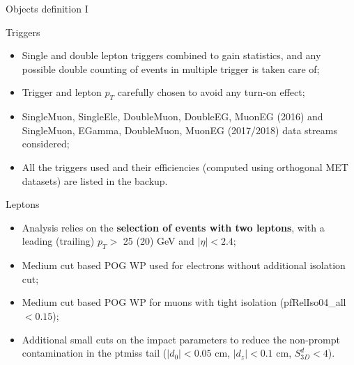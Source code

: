 \documentclass[8pt]{beamer}
\begin{document}
\begin{frame}{Objects definition I}
\justifying

\vspace{5pt} \begin{block}{\centering Triggers}\end{block} \vspace{-6pt}
\begin{itemize}
\justifying
\item \alert{Single and double lepton triggers} combined to gain statistics, and any possible double counting of events in multiple trigger is taken care of;
\item Trigger and lepton $p_T$ carefully chosen to avoid any turn-on effect;
\item SingleMuon, SingleEle, DoubleMuon, DoubleEG, MuonEG (2016) and SingleMuon, EGamma, DoubleMuon, MuonEG (2017/2018) data streams considered;
\item All the triggers used and their efficiencies (computed using orthogonal MET datasets) are listed in the backup.
\end{itemize} \vfill

\begin{block}{\centering Leptons}\end{block} \vspace{-6pt}
\begin{itemize}
\justifying
\item Analysis relies on the \textbf{selection of events with two leptons}, with a leading (trailing) $p_T >$ 25 (20) GeV and $|\eta| < 2.4$;
\item \alert{Medium cut based POG WP used for electrons} without additional isolation cut;
\item \alert{Medium cut based POG WP for muons} with tight isolation (pfRelIso04\_all $< 0.15$);
\item Additional small cuts on the impact parameters to reduce the non-prompt contamination in the ptmiss tail ($|d_0| < 0.05$ cm, $|d_z| < 0.1$ cm, $S_{3D}^d < 4$).
\end{itemize}
\end{frame}
\end{document}
